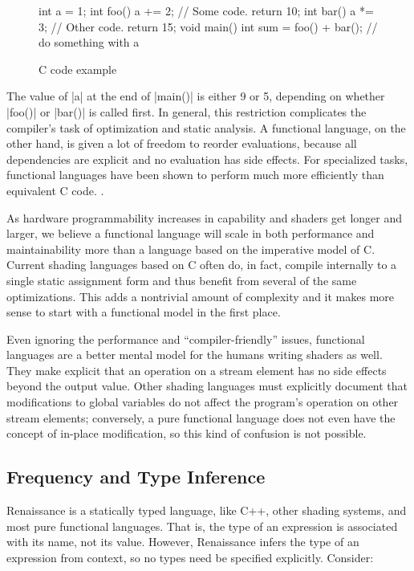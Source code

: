 \documentclass{acmsiggraph}               %
\begin{document}
\begin{figure}[htb]
\begin{MyVerb}
int a = 1;
int foo() {
  a += 2;
  // Some code.
  return 10;
}
int bar() {
  a *= 3;
  // Other code.
  return 15;
}
void main() {
  int sum = foo() + bar();
  // do something with a
}
\end{MyVerb}
\caption{C code example}
\label{CExample}
\end{figure}

The value of |a| at the end of |main()| is either 9 or 5, depending on
whether |foo()| or |bar()| is called first.  In general, this
restriction complicates the compiler's task of optimization and static
analysis.  A functional language, on the other hand, is given a lot of
freedom to reorder evaluations, because all dependencies are explicit
and no evaluation has side effects.  For specialized tasks, functional
languages have been shown to perform much more efficiently than
equivalent C code. \cite{ocaml,clean,sac}.

As hardware programmability increases in capability and shaders get
longer and larger, we believe a functional language will scale in both
performance and maintainability more than a language based on the
imperative model of C.  Current shading languages based on C often do,
in fact, compile internally to a single static assignment form and
thus benefit from several of the same optimizations.  This adds a
nontrivial amount of complexity and it makes more sense to start with
a functional model in the first place.

Even ignoring the performance and ``compiler-friendly'' issues,
functional languages are a better mental model for the humans writing
shaders as well.  They make explicit that an operation on a stream
element has no side effects beyond the output value.  Other shading
languages must explicitly document that modifications to global
variables do not affect the program's operation on other stream
elements; conversely, a pure functional language does not even have
the concept of in-place modification, so this kind of confusion is not
possible.


\subsection{Frequency and Type Inference}


Renaissance is a statically typed language, like C++, other shading
systems, and most pure functional languages.  That is, the type of an
expression is associated with its name, not its value.  However,
Renaissance infers the type of an expression from context, so no types
need be specified explicitly.  Consider:
\end{document}
